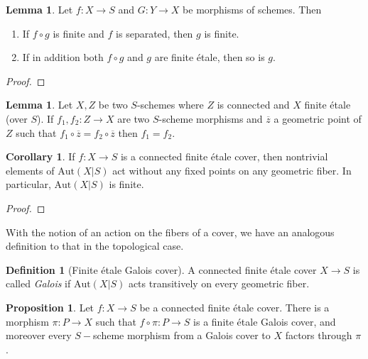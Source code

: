 \documentclass{article}
\theoremstyle{definition}
\newtheorem{lemma}[theorem]{Lemma}
\newtheorem{corollary}[theorem]{Corollary}
\newtheorem{proposition}[theorem]{Proposition}
\newtheorem{definition}[theorem]{Definition}
\theoremstyle{remark}
\begin{document}
\begin{lemma}
	Let $f\colon X \to S$ and $G: Y \to X$ be morphisms of schemes. 
	Then 
	\begin{enumerate}
		\item If $f \circ g$ is finite and $f$ is separated, then $g$ is finite.
		\item If in addition both $f \circ g$ and $g$ are finite \'etale, then so is $g$.
	\end{enumerate}
	
\end{lemma}

\begin{proof}
\end{proof}

\begin{lemma}
	Let $X, Z$ be two $S$-schemes where $Z$ is connected and $X$ finite \'etale (over $S$). 
	If $f_1, f_2: Z \to X$ are two $S$-scheme morphisms and $\overline{z}$ a geometric point of $Z$  such that $f_1 \circ \overline{z} = f_2 \circ \overline{z}$ then $f_1 = f_2$.
\end{lemma}

\begin{corollary}
	If $f: X \to S$ is a connected finite \'etale cover, then nontrivial elements of $\text{Aut}(X|S)$ act without any fixed points on any geometric fiber.
	In particular, $\text{Aut}(X|S)$ is finite.
\end{corollary}

\begin{proof}
\end{proof}

With the notion of an action on the fibers of a cover, we have an analogous definition to that in the topological case.

\begin{definition}[Finite \'etale Galois cover]
	A connected finite \'etale cover $X \to S$ is called \textit{Galois} if $\text{Aut}(X|S)$ acts transitively on every geometric fiber.
\end{definition}

\begin{proposition}
	Let $f: X \to S$ be a connected finite \'etale cover. 
	There is a morphism $\pi: P \to X$ such that $f \circ \pi: P \to S$ is a finite \'etale Galois cover, and moreover every $S-$scheme morphism from a Galois cover to $X$ factors through $\pi$.
\end{proposition}
\end{document}
